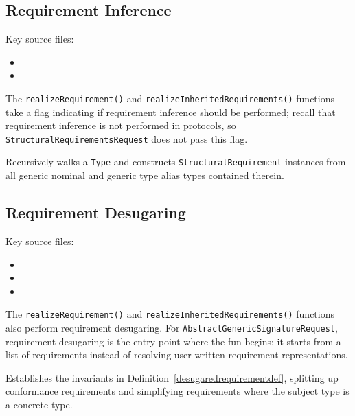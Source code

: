 \documentclass[../generics]{subfiles}
\begin{document}
\subsection*{Requirement Inference}

Key source files:
\begin{itemize}
\item {}
\item {}
\end{itemize}
The \texttt{realizeRequirement()} and \texttt{realizeInheritedRequirements()} functions take a flag indicating if requirement inference should be performed; recall that requirement inference is not performed in protocols, so \texttt{StructuralRequirementsRequest} does not pass this flag.

Recursively walks a \texttt{Type} and constructs \texttt{StructuralRequirement} instances from all generic nominal and generic type alias types contained therein.

\subsection*{Requirement Desugaring}

Key source files:
\begin{itemize}
\item {}
\item {}
\item {}
\end{itemize}

The \texttt{realizeRequirement()} and \texttt{realizeInheritedRequirements()} functions also perform requirement desugaring. For \texttt{AbstractGenericSignatureRequest}, requirement desugaring is the entry point where the fun begins; it starts from a list of requirements instead of resolving user-written requirement representations.

Establishes the invariants in Definition~\ref{desugaredrequirementdef}, splitting up conformance requirements and simplifying requirements where the subject type is a concrete type.
\end{document}
